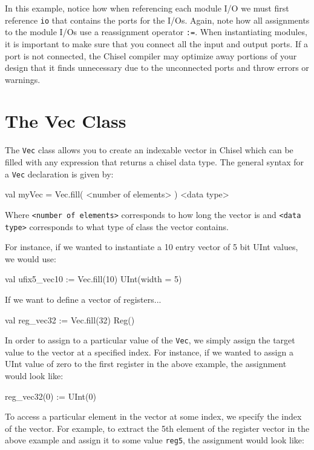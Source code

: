 In this example, notice how when referencing each module I/O we must first reference \verb+io+ that contains the ports for the I/Os. Again, note how all assignments to the module I/Os use a reassignment operator \verb+:=+. When instantiating modules, it is important to make sure that you connect all the input and output ports. If a port is not connected, the Chisel compiler may optimize away portions of your design that it finds unnecessary due to the unconnected ports and throw errors or warnings.

\section{The Vec Class}

The \verb+Vec+ class allows you to create an indexable vector in Chisel which can be filled with any expression that returns a chisel data type. The general syntax for a \verb+Vec+ declaration is given by:
\begin{scala}
val myVec = 
  Vec.fill( <number of elements> ) { <data type> }
\end{scala}
Where \verb+<number of elements>+ corresponds to how long the vector is and \verb+<data type>+ corresponds to what type of class the vector contains.

For instance, if we wanted to instantiate a 10 entry vector of 5 bit UInt values, we would use:

\begin{scala}
val ufix5_vec10 := Vec.fill(10) { UInt(width = 5) }
\end{scala}

If we want to define a vector of registers...

\begin{scala}
val reg_vec32 := Vec.fill(32){ Reg() }
\end{scala}

In order to assign to a particular value of the \verb+Vec+, we simply assign the target value to the vector at a specified index. For instance, if we wanted to assign a UInt value of zero to the first register in the above example, the assignment would look like:

\begin{scala}
reg_vec32(0) := UInt(0)
\end{scala}

To access a particular element in the vector at some index, we specify the index of the vector. For example, to extract the 5th element of the register vector in the above example and assign it to some value \verb+reg5+, the assignment would look like:

